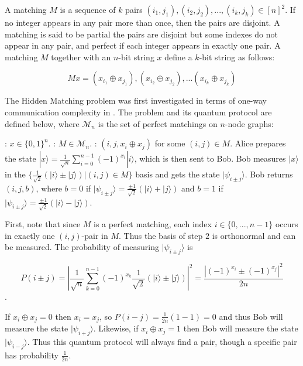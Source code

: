 \documentclass[a4paper]{article}
\begin{document}
        A matching $M$ is a sequence of $k$ pairs $(i_1, j_1), (i_2, j_2),...,(i_k, j_k) \in [n]^2$. If no integer appears in any pair more than once, then the pairs are disjoint. A matching is said to be partial the pairs are disjoint but some indexes do not appear in any pair, and perfect if each integer appears in exactly one pair. A matching $M$ together with an $n$-bit string $x$ define a $k$-bit string as follows:

        $$Mx = (x_{i_1} \oplus x_{j_1}), (x_{i_2} \oplus x_{j_2}), ... (x_{i_k} \oplus x_{j_k})$$

        The Hidden Matching problem was first investigated in terms of one-way communication complexity in \cite{doi:10.1137/060651835}. The problem and its quantum protocol are defined below, where $\mathcal{M}_n$ is the set of perfect matchings on $n$-node graphs:

        \begin{codebox}
            \zi {}: $x \in \{0,1\}^n$.
            \zi {}: $M \in \mathcal{M}_n$.
            \zi {}: $(i, j, x_i\oplus x_j)$ for some $(i, j) \in M$.
            \li Alice prepares the state $|x\rangle = \frac{1}{\sqrt{n}}\sum_{i = 0}^{n - 1}(-1)^{x_i}|i\rangle$, which is then sent to Bob.
            \li Bob measures $|x\rangle$ in the $\{\frac{1}{\sqrt{2}}(|i\rangle\pm|j\rangle)|(i, j) \in M\}$ basis and gets the state $|\psi_{i\pm j}\rangle$.
            \li Bob returns $(i, j, b)$, where $b = 0$ if $|\psi_{i\pm j}\rangle = \frac{\pm 1}{\sqrt{2}}(|i\rangle+|j\rangle)$ and $b = 1$ if $|\psi_{i\pm j}\rangle = \frac{\pm 1}{\sqrt{2}}(|i\rangle-|j\rangle)$.
        \end{codebox}

        First, note that since $M$ is a perfect matching, each index $i \in \{0,...,n-1\}$ occurs in exactly one $(i, j)$-pair in $M$. Thus the basis of step $2$ is orthonormal and can be measured. The probability of measuring $|\psi_{i \pm j}\rangle$ is

        $$P(i\pm j) = \left|\frac{1}{\sqrt{n}}\sum_{k=0}^{n-1}(-1)^{x_k}\frac{1}{\sqrt{2}}(|i\rangle \pm |j\rangle)\right|^2 = \frac{|(-1)^{x_i} \pm (-1)^{x_j}|^2}{2n}$$.

        If $x_i \oplus x_j = 0$ then $x_i = x_j$, so $P(i-j) = \frac{1}{2n}(1-1) = 0$ and thus Bob will measure the state $|\psi_{i+j}\rangle$. Likewise, if $x_i \oplus x_j = 1$ then Bob will measure the state $|\psi_{i-j}\rangle$. Thus this quantum protocol will always find a pair, though a specific pair has probability $\frac{1}{2n}$.
\end{document}
